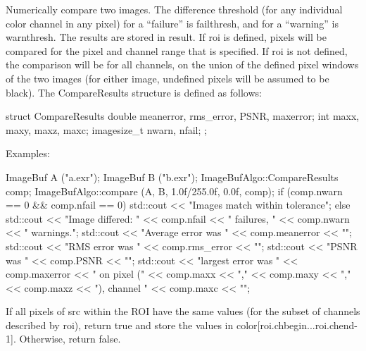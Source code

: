  

Numerically compare two images.  The difference threshold (for any
individual color channel in any pixel) for a ``failure'' is
{\cf failthresh}, and for a ``warning'' is {\cf warnthresh}.  The 
results are stored in {\cf result}.  If {\cf roi} is defined, pixels
will be compared for the pixel and channel range that is specified.  If
{\cf roi} is not defined, the comparison will be for all channels, on
the union of the defined pixel windows of the two images (for either
image, undefined pixels will be assumed to be black).  The 
{\cf CompareResults} structure is defined as follows:
\begin{code}
struct CompareResults {
    double meanerror, rms_error, PSNR, maxerror;
    int maxx, maxy, maxz, maxc;
    imagesize_t nwarn, nfail;
};
\end{code}

\smallskip
\noindent Examples:
\begin{code}
    ImageBuf A ("a.exr");
    ImageBuf B ("b.exr");
    ImageBufAlgo::CompareResults comp;
    ImageBufAlgo::compare (A, B, 1.0f/255.0f, 0.0f, comp);
    if (comp.nwarn == 0 && comp.nfail == 0) {
        std::cout << "Images match within tolerance\n";
    } else {
        std::cout << "Image differed: " << comp.nfail << " failures, "
                  << comp.nwarn << " warnings.\n";
        std::cout << "Average error was " << comp.meanerror << "\n";
        std::cout << "RMS error was " << comp.rms_error << "\n";
        std::cout << "PSNR was " << comp.PSNR << "\n";
        std::cout << "largest error was " << comp.maxerror 
                  << " on pixel (" << comp.maxx << "," << comp.maxy 
                  << "," << comp.maxz << "), channel " << comp.maxc << "\n";
    }
\end{code}
\apiend


 

If all pixels of {\cf src} within the ROI have the same values (for the
subset of channels described by {\cf roi}), return {\cf true} and store
the values in {\cf color[roi.chbegin...roi.chend-1]}.  Otherwise, return
{\cf false}.

